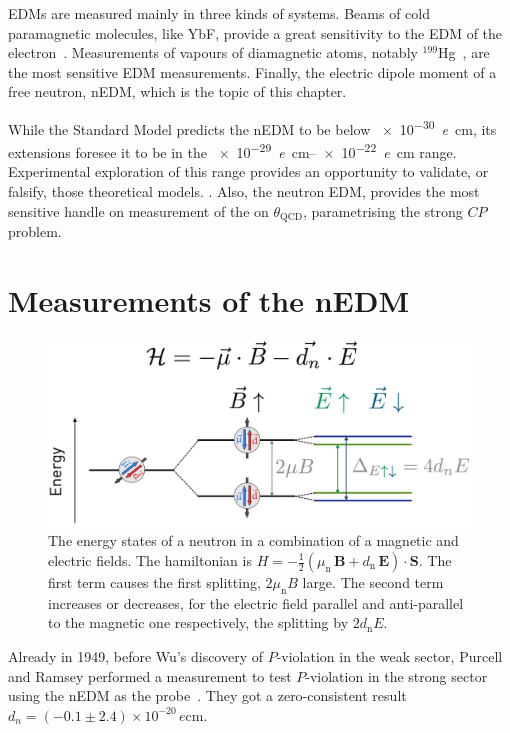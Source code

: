 EDMs are measured mainly in three kinds of systems. Beams of cold paramagnetic molecules, like YbF, provide a great sensitivity to the EDM of the electron~\cite{Hudson2011}. Measurements of vapours of diamagnetic atoms, notably $^{199}$Hg~\cite{PhysRevLett.116.161601}, are the most sensitive EDM measurements. Finally, the electric dipole moment of a free neutron, nEDM, which is the topic of this chapter.

While the Standard Model predicts the nEDM to be below \SI{e-30}{\elementarycharge\centi\meter}, its extensions foresee it to be in the \SIrange[range-phrase = --]{e-29}{e-22}{\elementarycharge\centi\meter} range. Experimental exploration of this range provides an opportunity to validate, or falsify, those theoretical models. . Also, the neutron EDM, provides the most sensitive handle on measurement of the on $\theta_\text{QCD}$, parametrising the strong $CP$ problem.



\section{Measurements of the nEDM}

\begin{figure}
  \centering
  \includegraphics[width=\linewidth]{gfx/nEDMatPSI/measurement_principle.png}
  \caption{The energy states of a neutron in a combination of a magnetic and electric fields. The hamiltonian is $H = - \frac{1}{2} \left( \mu_\text{n} \, \bm{B} + d_\text{n} \, \bm{E} \right ) \cdot \bm{S}$. The first term causes the first splitting, $2\mu_\text{n} B$ large. The second term increases or decreases, for the electric field parallel and anti-parallel to the magnetic one respectively, the splitting by $2 d_\text{n} E$.}
  \label{fig:nEDM_measurement_principle}
\end{figure}

Already in 1949, before Wu's discovery of $P$-violation in the weak sector, Purcell and Ramsey performed a measurement to test $P$-violation in the strong sector using the nEDM as the probe~\cite{PhysRev.108.120}. They got a zero-consistent result $d_n = (-0.1 \pm 2.4) \times 10^{-20}\,\si{\elementarycharge\centi\meter}$.

